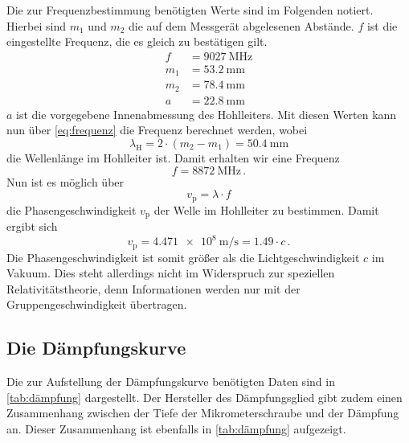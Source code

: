 Die zur Frequenzbestimmung benötigten Werte sind im Folgenden notiert.
Hierbei sind $m_1$ und $m_2$ die auf dem Messgerät abgelesenen Abstände.
$f$ ist die eingestellte Frequenz, die es gleich zu bestätigen gilt.
\begin{align*}
    f &= \SI{9027}{\mega\hertz} \\
    m_1 &= \SI{53.2}{\milli\meter} \\
    m_2 &= \SI{78.4}{\milli\meter} \\
    a &= \SI{22.8}{\milli\meter}
\end{align*}
$a$ ist die vorgegebene Innenabmessung des Hohlleiters.
Mit diesen Werten kann nun über \autoref{eq:frequenz} die Frequenz berechnet werden, wobei 
\begin{equation}
    \lambda _\text{H} = 2 \cdot (m_2 - m_1)= \SI{50.4}{\milli\meter}
    \label{eq:welle}
\end{equation}
die Wellenlänge im Hohlleiter ist.
Damit erhalten wir eine Frequenz
\begin{equation*}
    f = \SI{8872}{\mega\hertz} \, .
\end{equation*}
Nun ist es möglich über
\begin{equation}
    v_\text{p} = \lambda \cdot f
    \label{eq:phasengeschw}
\end{equation}
die Phasengeschwindigkeit $v_\text{p}$ der Welle im Hohlleiter zu bestimmen.
Damit ergibt sich 
\begin{equation*}
    v_\text{p} =  \SI{4.471e8}{\meter\per\second} = \num{1.49} \cdot c \, .
\end{equation*}
Die Phasengeschwindigkeit ist somit größer als die Lichtgeschwindigkeit $c$ im Vakuum.
Dies steht allerdings nicht im Widerspruch zur speziellen Relativitätstheorie, denn Informationen werden nur mit der Gruppengeschwindigkeit übertragen.

\subsection{Die Dämpfungskurve}
\label{ssec:a3}

Die zur Aufstellung der Dämpfungskurve benötigten Daten sind in \autoref{tab:dämpfung} dargestellt. 
Der Hersteller des Dämpfungsglied gibt zudem einen Zusammenhang zwischen der Tiefe der Mikrometerschraube und der Dämpfung an.
Dieser Zusammenhang ist ebenfalls in \autoref{tab:dämpfung} aufgezeigt.

